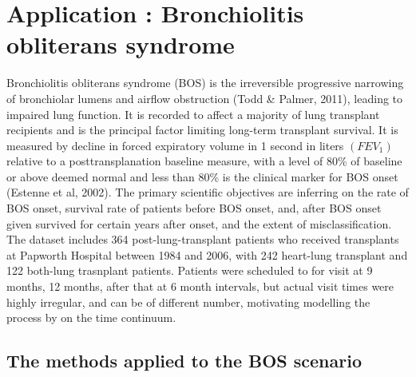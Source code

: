 \documentclass{uwstat572}
\begin{document}


\section{Application : Bronchiolitis obliterans syndrome}
Bronchiolitis obliterans syndrome (BOS) is the irreversible progressive narrowing of bronchiolar lumens and airflow obstruction (Todd \& Palmer, 2011), leading to impaired lung function. It is recorded to affect a majority of lung transplant recipients and is the principal factor limiting long-term transplant survival. It is measured by decline in forced expiratory volume in 1 second in liters $(FEV_1)$ relative to a posttransplanation baseline measure, with a level of 80\% of baseline or above deemed normal and less than 80\% is the clinical marker for BOS onset (Estenne et al, 2002). The primary scientific objectives are inferring on the rate of BOS onset, survival rate of patients before BOS onset, and, after BOS onset given survived for certain years after onset, and the extent of misclassification. The dataset includes 364 post-lung-transplant patients who received transplants at Papworth Hospital between 1984 and 2006, with 242 heart-lung transplant and 122 both-lung trasnplant patients. Patients were scheduled to for visit at 9 months, 12 months, after that at 6 month intervals, but actual visit times were highly irregular, and can be of different number, motivating modelling the process by on the time continuum.

\subsection{The methods applied to the BOS scenario}
\end{document}
